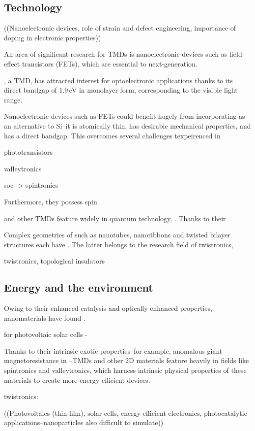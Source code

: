 \documentclass[11pt,a4paper,twoside]{report}  %
\numberwithin{equation}{section}					%
\numberwithin{figure}{section}						%
\newcommand{\red}[1]{{\color{red}#1}}
\begin{document}
\subsection{Technology}

\red{((Nanoelectronic devices, role of strain and defect engineering, importance of doping in electronic properties))}

An area of significant research for TMDs is nanoelectronic devices such as field-effect transistors (FETs), which are essential to next-generation.


, a TMD, has attracted interest for optoelectronic applications thanks to its direct bandgap of 1.9\,eV in monolayer form, corresponding to the visible light range. 

Nanoelectronic devices such as FETs could benefit hugely from incorporating  as an alternative to Si--it is atomically thin, has desirable mechanical properties, and has a direct bandgap. This overcomes several challenges texpeirenced in 


phototransistors

valleytronics

soc -> spintronics

Furthermore, they possess spin


 and other TMDs feature widely in quantum technology, . Thanks to their


Complex geometries of  such as nanotubes, nanoribbons and twisted bilayer structures each have . The latter belongs to the research field of twistronics, 

twistronics, topological insulators

\subsection{Energy and the environment}

Owing to their enhanced catalysis and optically enhanced properties, nanomaterials have found . 

 for photovoltaic solar cells - 

Thanks to their intrinsic exotic properties--for example, anomalous giant magnetoresistance in --TMDs and other 2D materials feature heavily in fields like spintronics and valleytronics, which harness intrinsic physical properties of these materials to create more energy-efficient devices.

twistronics: 

\red{((Photovoltaics (thin film), solar cells, energy-efficient electronics, photocatalytic applications--nanoparticles also difficult to simulate))}
\end{document}

